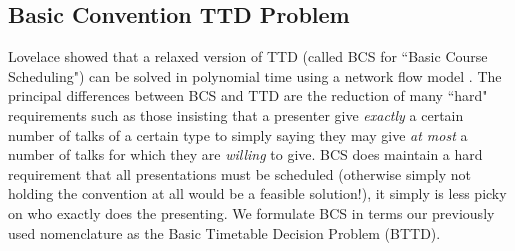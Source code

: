 \documentclass[]{article}
\theoremstyle{definition}
\theoremstyle{remark}
\numberwithin{equation}{section}
\begin{document}
\subsection{Basic Convention TTD Problem}
Lovelace showed that a relaxed version of TTD (called BCS for ``Basic Course Scheduling") can be solved in polynomial time using a network flow model \cite{lovelace2010}. The principal differences between BCS and TTD are the reduction of many ``hard" requirements such as those insisting that a presenter give \emph{exactly} a certain number of talks of a certain type to simply saying they may give \emph{at most} a number of talks for which they are \emph{willing} to give. BCS does maintain a hard requirement that all presentations must be scheduled (otherwise simply not holding the convention at all would be a feasible solution!), it simply is less picky on who exactly does the presenting. We formulate BCS in terms our previously used nomenclature as the Basic Timetable Decision Problem (BTTD).
\end{document}
